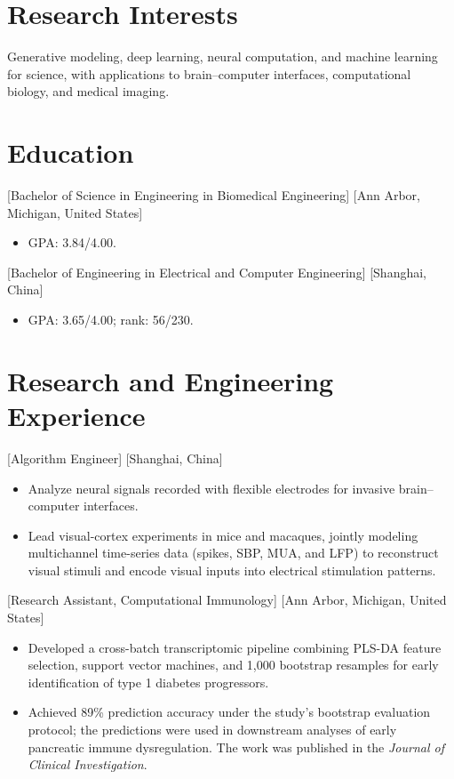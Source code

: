 \documentclass{chicv}
\begin{document}
\begin{basicinfo}
\end{basicinfo}

\section{Research Interests}
Generative modeling, deep learning, neural computation, and machine learning for science,
with applications to brain--computer interfaces, computational biology, and medical imaging.

\section{Education}
  [Bachelor of Science in Engineering in Biomedical Engineering]
  [Ann Arbor, Michigan, United States]
  \begin{itemize}
    \item GPA: 3.84/4.00.
  \end{itemize}

  [Bachelor of Engineering in Electrical and Computer Engineering]
  [Shanghai, China]
  \begin{itemize}
    \item GPA: 3.65/4.00; rank: 56/230.
  \end{itemize}

\section{Research and Engineering Experience}
  [Algorithm Engineer]
  [Shanghai, China]
  \begin{itemize}
    \item Analyze neural signals recorded with flexible electrodes for invasive brain--computer interfaces.
    \item Lead visual-cortex experiments in mice and macaques, jointly modeling multichannel
      time-series data (spikes, SBP, MUA, and LFP) to reconstruct visual stimuli and encode visual
      inputs into electrical stimulation patterns.
  \end{itemize}

  [Research Assistant, Computational Immunology]
  [Ann Arbor, Michigan, United States]
  \begin{itemize}
    \item Developed a cross-batch transcriptomic pipeline combining PLS-DA feature selection,
      support vector machines, and 1,000 bootstrap resamples for early identification of type 1
      diabetes progressors.
    \item Achieved 89\% prediction accuracy under the study's bootstrap evaluation protocol; the
      predictions were used in downstream analyses of early pancreatic immune dysregulation. The
      work was published in the
      \textit{Journal of Clinical Investigation}.
  \end{itemize}
\end{document}
